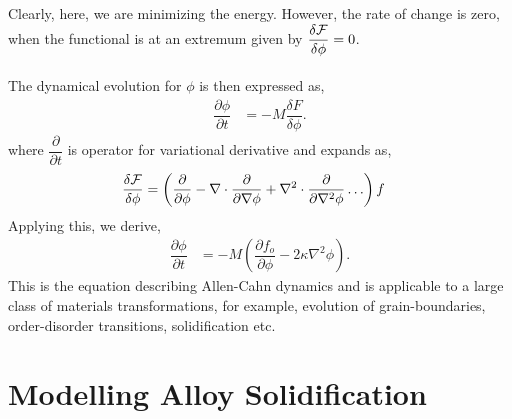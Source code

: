 \documentclass[12pt,a4paper]{report}
\begin{document}
Clearly, here, we are minimizing the energy. However, the rate of change is zero, when the functional is at an extremum given by $\dfrac{\delta {\cal F}}{\delta \phi} = 0$.\\
\\
The dynamical evolution for $\phi$ is then expressed as,
\begin{align}
 \dfrac{\partial \phi}{\partial t} &= -M \dfrac{\delta F}{\delta \phi}.
\end{align}
where 
$
\dfrac{\partial}{\partial t}
$
is operator for variational derivative and expands as,
\begin{align}
 \dfrac{\delta {\cal F}}{\delta \phi} &= \left(\dfrac{\partial}{\partial \phi} - 
 \nabla \cdot \dfrac{\partial}{\partial \nabla\phi} + \nabla^{2}\cdot\dfrac{\partial }{\partial \nabla^{2}\phi}\ldots\right)f  
 \label{variational_derivative}
\end{align}
Applying this, we derive,
\begin{align}
 \dfrac{\partial \phi}{\partial t} &= -M \left(\dfrac{\partial f_o}{\partial \phi} - 2\kappa\nabla^{2}\phi\right).
\end{align} 
This is the equation describing Allen-Cahn dynamics and is applicable to a large class of materials transformations, for example, evolution of grain-boundaries, order-disorder transitions, solidification etc.

\section{Modelling Alloy Solidification}
\end{document}
